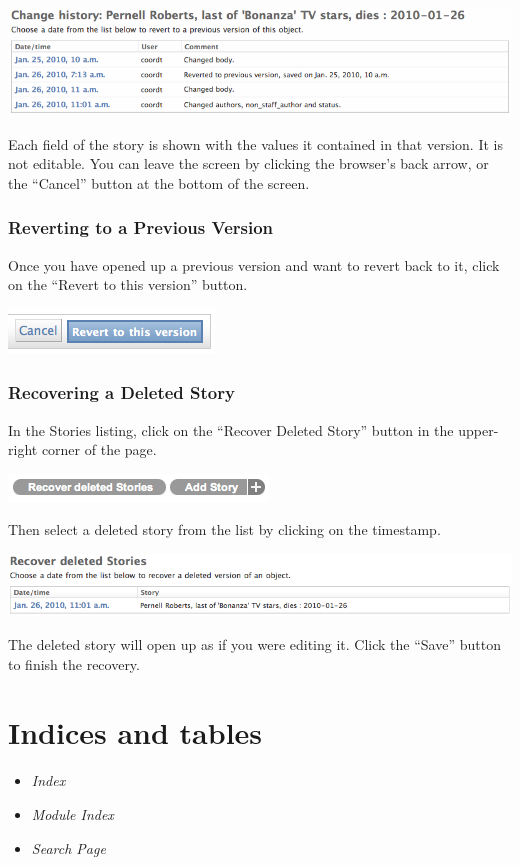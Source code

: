 \documentclass[letterpaper,10pt,english]{manual}
\begin{document}
\includegraphics{history_list.png}

Each field of the story is shown with the values it contained in that version. It is not editable. You can leave the screen by clicking the browser's back arrow, or the ``Cancel'' button at the bottom of the screen.


\subsection{Reverting to a Previous Version}

Once you have opened up a previous version and want to revert back to it, click on the ``Revert to this version'' button.

\includegraphics{history_save_btn.png}


\subsection{Recovering a Deleted Story}

In the Stories listing, click on the ``Recover Deleted Story'' button in the upper-right corner of the page.

\includegraphics{recover_btn.png}

Then select a deleted story from the list by clicking on the timestamp.

\includegraphics{recover_list.png}

The deleted story will open up as if you were editing it. Click the ``Save'' button to finish the recovery.


\chapter{Indices and tables}
\begin{itemize}
\item {} 
\emph{Index}

\item {} 
\emph{Module Index}

\item {} 
\emph{Search Page}

\end{itemize}


\renewcommand{\indexname}{Module Index}
\printmodindex
\renewcommand{\indexname}{Index}
\printindex
\end{document}

